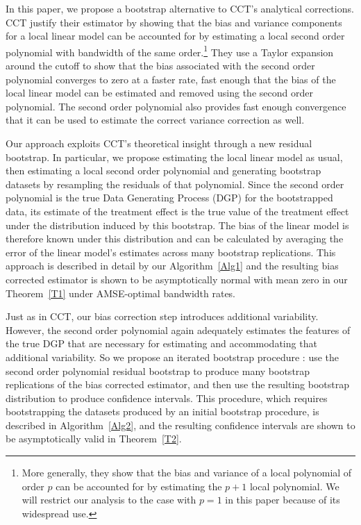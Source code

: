 \documentclass[12pt,fleqn]{article}
\begin{document}
In this paper, we propose a bootstrap alternative to CCT's analytical
corrections. CCT justify their estimator by showing that the bias and variance
components for a local linear model can be accounted for by estimating a local
second order polynomial with bandwidth of the same order.\footnote{%
  More generally, they show that the bias and variance of a local polynomial of
  order $p$ can be accounted for by estimating the $p+1$ local polynomial. We
  will restrict our analysis to the case with $p = 1$ in this paper because
  of its widespread use.} %
They use a Taylor expansion around the cutoff to show that the bias associated
with the second order polynomial converges to zero at a faster rate, fast
enough that the bias of the local linear model can be estimated and removed
using the second order polynomial. The second order polynomial also provides
fast enough convergence that it can be used to estimate the correct variance
correction as well.

Our approach exploits CCT's theoretical insight through a new residual
bootstrap. In particular, we propose estimating the local linear model as usual,
then estimating a local second order polynomial and generating bootstrap
datasets by resampling the residuals of that polynomial. Since the second order
polynomial is the true Data Generating Process (DGP) for the bootstrapped data,
its estimate of the treatment effect is the true value of the treatment effect
under the distribution induced by this bootstrap. The bias of the linear model
is therefore known
under this distribution and can be calculated by averaging the error of the
linear model's estimates across many bootstrap replications. This approach is
described in detail by our Algorithm~\ref{Alg1} and the resulting bias corrected
estimator is shown to be asymptotically normal with mean zero in our
Theorem~\ref{T1} under AMSE-optimal bandwidth rates.

Just as in CCT, our bias correction step introduces additional
variability. However, the second order polynomial again adequately estimates the
features of the true DGP that are necessary for estimating and accommodating that
additional variability. So we propose
an iterated bootstrap procedure \citep{hall1988}: use the second order
polynomial residual bootstrap to produce many bootstrap replications of the bias
corrected estimator, and then use the resulting bootstrap distribution to
produce confidence intervals. This procedure, which requires bootstrapping the
datasets produced by an initial bootstrap procedure, is described in Algorithm~\ref{Alg2}, and the resulting confidence intervals are shown to be asymptotically valid in Theorem~\ref{T2}.
\end{document}
